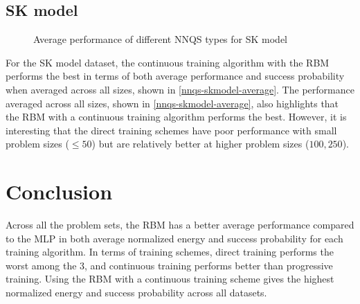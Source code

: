 \subsection{SK model}

\begin{figure}[!htbp]
    \centering
    \hfill
    \caption{Average performance of different NNQS types for SK model}
    \label{nnqs-skmodel-average}
\end{figure}

For the SK model dataset, the continuous training algorithm with the RBM performs the best in terms of both average performance and success probability when averaged across all sizes, shown in \autoref{nnqs-skmodel-average}. The performance averaged across all sizes, shown in \autoref{nnqs-skmodel-average}, also highlights that the RBM with a continuous training algorithm performs the best. However, it is interesting that the direct training schemes have poor performance with small problem sizes ($\leq 50$) but are relatively better at higher problem sizes ($100, 250$).

\section{Conclusion}
Across all the problem sets, the RBM has a better average performance compared to the MLP in both average normalized energy and success probability for each training algorithm. In terms of training schemes, direct training performs the worst among the 3, and continuous training performs better than progressive training. Using the RBM with a continuous training scheme gives the highest normalized energy and success probability across all datasets.

